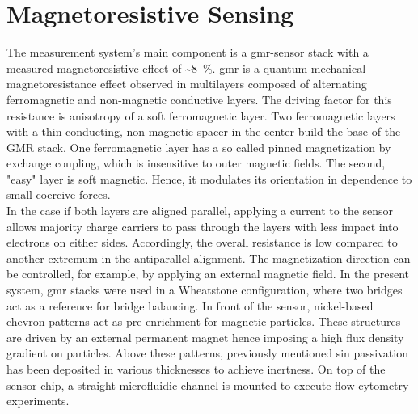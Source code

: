 \clearpage
\section{Magnetoresistive Sensing}
The measurement system's main component is a \gls{gmr}-sensor stack with a measured magnetoresistive effect of \textasciitilde \SI{8}{\percent}. \gls{gmr} is a quantum mechanical magnetoresistance effect observed in multilayers composed of alternating ferromagnetic and non-magnetic conductive layers. The driving factor for this resistance is anisotropy of a soft ferromagnetic layer. Two ferromagnetic layers with a thin conducting, non-magnetic spacer in the center build the base of the GMR stack.\cite{lit:nano:magnetism} One ferromagnetic layer has a so called pinned magnetization by exchange coupling, which is insensitive to outer magnetic fields. The second, "easy" layer is soft magnetic. Hence, it modulates its orientation in dependence to small coercive forces. \cite{lit:nano:Guimares2017}\\
In the case if both layers are aligned parallel, applying a current to the sensor allows majority charge carriers to pass through the layers with less impact into electrons on either sides. Accordingly, the overall resistance is low compared to another extremum in the antiparallel alignment. The magnetization direction can be controlled, for example, by applying an external magnetic field.\cite{lit:nano:physicsmagneticmaterials, lit:nano:GMRPatent} \newline
In the present system, \gls{gmr} stacks were used in a Wheatstone configuration, where two bridges act as a reference for bridge balancing. In front of the sensor, nickel-based chevron patterns act as pre-enrichment for magnetic particles. These structures are driven by an external permanent magnet hence imposing a high flux density gradient on particles. Above these patterns, previously mentioned \gls{sin} passivation has been deposited in various thicknesses to achieve inertness. On top of the sensor chip, a straight microfluidic channel is mounted to execute flow cytometry experiments.\cite{lit:paperHelou,lit:paperReisbeck}
\begin{figure}[!h]
	\centering
	\hfill	
	\label{fig:MRCyte}
\end{figure}

